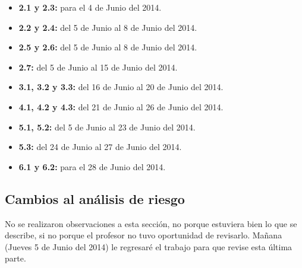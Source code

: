 \documentclass[letterpaper]{article}
\begin{document}
\begin{itemize}
\item \textbf{2.1 y 2.3:} para el 4 de Junio del 2014.
\item \textbf{2.2 y 2.4:} del 5 de Junio al 8 de Junio del 2014.
\item \textbf{2.5 y 2.6:} del 5 de Junio al 8 de Junio del 2014.
\item \textbf{2.7:} del 5 de Junio al 15 de Junio del 2014.
\item \textbf{3.1, 3.2 y 3.3:} del 16 de Junio al 20 de Junio del 2014.
\item \textbf{4.1, 4.2 y 4.3:} del 21 de Junio al 26 de Junio del 2014.
\item \textbf{5.1, 5.2:} del 5 de Junio al 23 de Junio del 2014.
\item \textbf{5.3:} del 24 de Junio al 27 de Junio del 2014.
\item \textbf{6.1 y 6.2:} para el 28 de Junio del 2014.
\end{itemize}

\subsection{Cambios al análisis de riesgo}
No se realizaron observaciones a esta sección, no porque estuviera bien lo que se describe, si no porque el profesor no tuvo oportunidad de revisarlo. Mañana (Jueves 5 de Junio del 2014) le regresaré el trabajo para que revise esta última parte.
\end{document}
